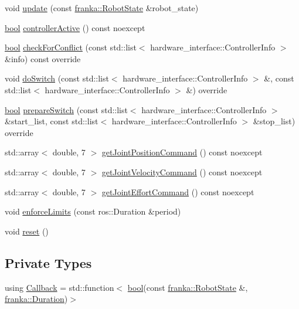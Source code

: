 \begin{DoxyCompactItemize}
\item 
void \hyperlink{classfranka__hw_1_1FrankaHW_ad8f348151b93a7eebc9ef45a702a29ee}{update} (const \hyperlink{structfranka_1_1RobotState}{franka\+::\+Robot\+State} \&robot\+\_\+state)
\item 
\hyperlink{classbool}{bool} \hyperlink{classfranka__hw_1_1FrankaHW_a8fcc0a82b0c13cdbd1de7fea38c3ecc3}{controller\+Active} () const noexcept
\item 
\hyperlink{classbool}{bool} \hyperlink{classfranka__hw_1_1FrankaHW_a73e581982455acacca51d81e4676e9a6}{check\+For\+Conflict} (const std\+::list$<$ hardware\+\_\+interface\+::\+Controller\+Info $>$ \&info) const override
\item 
void \hyperlink{classfranka__hw_1_1FrankaHW_ab29812769471d212a30dac6c19c12884}{do\+Switch} (const std\+::list$<$ hardware\+\_\+interface\+::\+Controller\+Info $>$ \&, const std\+::list$<$ hardware\+\_\+interface\+::\+Controller\+Info $>$ \&) override
\item 
\hyperlink{classbool}{bool} \hyperlink{classfranka__hw_1_1FrankaHW_ab73b14d5f8481cd3cb3d670aeae2de06}{prepare\+Switch} (const std\+::list$<$ hardware\+\_\+interface\+::\+Controller\+Info $>$ \&start\+\_\+list, const std\+::list$<$ hardware\+\_\+interface\+::\+Controller\+Info $>$ \&stop\+\_\+list) override
\item 
std\+::array$<$ double, 7 $>$ \hyperlink{classfranka__hw_1_1FrankaHW_a80bc3da19575532ab827bc9c62f91bed}{get\+Joint\+Position\+Command} () const noexcept
\item 
std\+::array$<$ double, 7 $>$ \hyperlink{classfranka__hw_1_1FrankaHW_a93067ec2c8ba530188ee70f024ddf100}{get\+Joint\+Velocity\+Command} () const noexcept
\item 
std\+::array$<$ double, 7 $>$ \hyperlink{classfranka__hw_1_1FrankaHW_ae8063f56d7e70e0f7537fe1d522f8f2f}{get\+Joint\+Effort\+Command} () const noexcept
\item 
void \hyperlink{classfranka__hw_1_1FrankaHW_afb0f49fec764be80e4c89e29706a4936}{enforce\+Limits} (const ros\+::\+Duration \&period)
\item 
void \hyperlink{classfranka__hw_1_1FrankaHW_aaa0bc020099cb6dba41728252d0c7df4}{reset} ()
\end{DoxyCompactItemize}
\subsection*{Private Types}
\begin{DoxyCompactItemize}
\item 
using \hyperlink{classfranka__hw_1_1FrankaHW_ac576bd5140a03864888c68519daa5aa4}{Callback} = std\+::function$<$ \hyperlink{classbool}{bool}(const \hyperlink{structfranka_1_1RobotState}{franka\+::\+Robot\+State} \&, \hyperlink{classfranka_1_1Duration}{franka\+::\+Duration})$>$
\end{DoxyCompactItemize}
